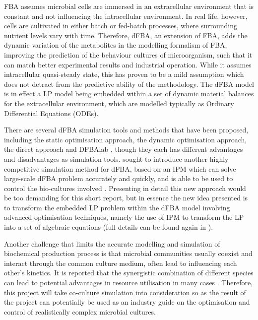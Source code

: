 \documentclass[11pt,a4paper,english]{article}
\begin{document}
FBA assumes microbial cells are immersed in an extracellular environment that is constant and not influencing the intracellular environment. In real life, however, cells are cultivated in either batch or fed-batch processes, where surrounding nutrient levels vary with time. Therefore, dFBA, an extension of FBA, adds the dynamic variation of the metabolites in the modelling formalism of FBA, improving the prediction of the behaviour cultures of microorganism, such that it can match better experimental results and industrial operation. While it assumes intracellular quasi-steady state, this has proven to be a mild assumption which does not detract from the predictive ability of the methodology. The dFBA model is in effect a LP model being embedded within a set of dynamic material balances for the extracellular environment, which are modelled typically as Ordinary Differential Equations (ODEs).

There are several dFBA simulation tools and methods that have been proposed, including the static optimisation approach, the dynamic optimisation approach, the direct approach and DFBAlab \citep{harwood2016efficient}, though they each has different advantages and disadvantages as simulation tools. \citep{scott2018simulation} sought to introduce another highly competitive simulation method for dFBA, based on an IPM which can solve large-scale dFBA problem accurately and quickly, and is able to be used to control the bio-cultures involved \citep{Vassiliadis2018,monteiro1989interior}.  Presenting in detail this new approach would be too demanding for this short report, but in essence the new idea presented is to transform the embedded LP problem within the dFBA model involving advanced optimisation techniques, namely the use of IPM to transform the LP into a set of algebraic equations (full details can be found again in \citep{scott2018simulation}).

Another challenge that limits the accurate modelling and simulation of biochemical production process is that microbial communities usually coexist and interact through the common culture medium, often lead to influencing each other’s kinetics. It is reported that the synergistic combination of different species can lead to potential advantages in resource utilisation in many cases \citep{henson2014dynamic,gomez2016sugars}. Therefore, this project will take co-culture simulation into consideration so as the result of the project can potentially be used as an industry guide on the optimisation and control of realistically complex microbial cultures.
\end{document}
